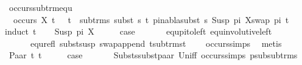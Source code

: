 \begin{isabellebody}
\isanewline
\isanewline
\isanewline
\isanewline
{}\isamarkupfalse%
\ occurs{\isacharunderscore}{\kern0pt}sub{\isacharunderscore}{\kern0pt}trm{\isacharunderscore}{\kern0pt}equ{\isacharcolon}{\kern0pt}\ \isanewline
\ \ {\isachardoublequoteopen}occurs\ X\ t{}\ {\isasymLongrightarrow}\ {\isacharparenleft}{\kern0pt}{\isasymexists}\ t{}\ {\isasymin}\ sub{\isacharunderscore}{\kern0pt}trms\ {\isacharparenleft}{\kern0pt}subst\ s\ t{}{\isacharparenright}{\kern0pt}{\isachardot}{\kern0pt}\ {\isacharparenleft}{\kern0pt}{\isasymexists}pi{\isachardot}{\kern0pt}{\isacharparenleft}{\kern0pt}nabla{\isasymturnstile}subst\ s\ {\isacharparenleft}{\kern0pt}Susp\ pi{}\ X{\isacharparenright}{\kern0pt}{\isasymapprox}{\isacharparenleft}{\kern0pt}swap\ pi\ t{}{\isacharparenright}{\kern0pt}{\isacharparenright}{\kern0pt}{\isacharparenright}{\kern0pt}{\isacharparenright}{\kern0pt}{\isachardoublequoteclose}\ \isanewline
%
\isadelimproof
%
\endisadelimproof
%
\isatagproof
{}\isamarkupfalse%
{\isacharparenleft}{\kern0pt}induct\ t{}{\isacharparenright}{\kern0pt}\isanewline
\ \ \isamarkupfalse%
\ {\isacharparenleft}{\kern0pt}Susp\ pi{\isacharprime}{\kern0pt}\ X{\isacharparenright}{\kern0pt}\isanewline
\ \ \isamarkupfalse%
\ \isamarkupfalse%
\ {\isacharquery}{\kern0pt}case\ \isanewline
\ \ \ \ \isamarkupfalse%
\ equ{\isacharunderscore}{\kern0pt}pi{\isacharunderscore}{\kern0pt}to{\isacharunderscore}{\kern0pt}left\ equ{\isacharunderscore}{\kern0pt}involutive{\isacharunderscore}{\kern0pt}left\ \isanewline
\ \ \ \ \ \ equ{\isacharunderscore}{\kern0pt}refl\ subst{\isacharunderscore}{\kern0pt}susp\ swap{\isacharunderscore}{\kern0pt}append\ t{\isacharunderscore}{\kern0pt}sub{\isacharunderscore}{\kern0pt}trms{\isacharunderscore}{\kern0pt}t\isanewline
\ \ \ \ occurs{\isachardot}{\kern0pt}simps{\isacharparenleft}{\kern0pt}{}{\isacharparenright}{\kern0pt}\ \isamarkupfalse%
\ metis\isanewline
{}\isamarkupfalse%
\isanewline
\ \ \isamarkupfalse%
\ {\isacharparenleft}{\kern0pt}Paar\ t{}{}\ t{}{}{\isacharparenright}{\kern0pt}\isanewline
\ \ \isamarkupfalse%
\ \isamarkupfalse%
\ {\isacharquery}{\kern0pt}case\ \isanewline
\ \ \ \ \isamarkupfalse%
\ Substs{\isachardot}{\kern0pt}subst{\isacharunderscore}{\kern0pt}paar\ Un{\isacharunderscore}{\kern0pt}iff\ occurs{\isachardot}{\kern0pt}simps{\isacharparenleft}{\kern0pt}{}{\isacharparenright}{\kern0pt}\ psub{\isacharunderscore}{\kern0pt}sub{\isacharunderscore}{\kern0pt}trms\isanewline

\end{isabellebody}
